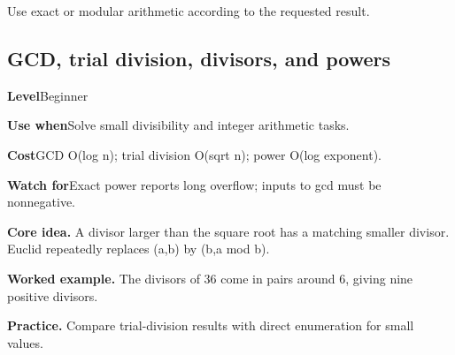 \documentclass[10pt,letterpaper]{article}
\newcommand{\entrylabel}[1]{\textcolor{accent}{\bfseries #1}}
\begin{document}
\begin{guidebox}Use exact or modular arithmetic according to the requested result.\end{guidebox}
\subsection{GCD, trial division, divisors, and powers}
\begin{guidebox}\small
\entrylabel{Level}\quad Beginner\par
\entrylabel{Use when}\quad Solve small divisibility and integer arithmetic tasks.\par
\entrylabel{Cost}\quad GCD O(log n); trial division O(sqrt n); power O(log exponent).\par
\entrylabel{Watch for}\quad Exact power reports long overflow; inputs to gcd must be nonnegative.\par
\end{guidebox}
\noindent\textbf{Core idea.} A divisor larger than the square root has a matching smaller divisor. Euclid repeatedly replaces (a,b) by (b,a mod b).\par
\noindent\textbf{Worked example.} The divisors of 36 come in pairs around 6, giving nine positive divisors.\par
\noindent\textbf{Practice.} Compare trial-division results with direct enumeration for small values.\par
\end{document}
